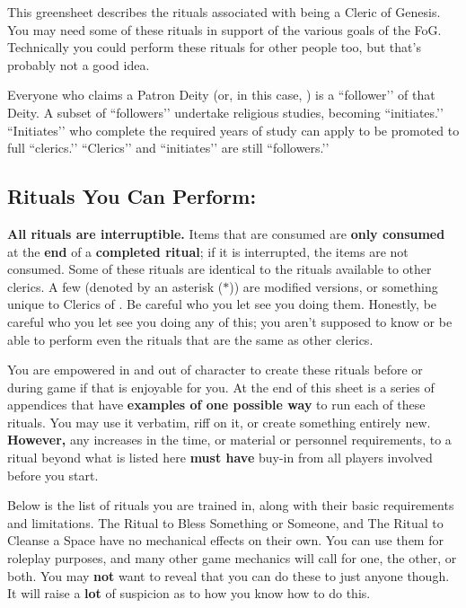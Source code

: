 \documentclass[green]{GL2020}
\begin{document}
\name{\gFoGCleric{}}

This greensheet describes the rituals associated with being a Cleric of Genesis. You may need some of these rituals in support of the various goals of the FoG. Technically you could perform these rituals for other people too, but that's probably not a good idea.

Everyone who claims a Patron Deity (or, in this case, \cGenesis{}) is a ``follower’’ of that Deity. A subset of ``followers’’ undertake religious studies, becoming ``initiates.’’ ``Initiates’’ who complete the required years of study can apply to be promoted to full ``clerics.’’ ``Clerics’’ and ``initiates’’ are still ``followers.’’

\subsection*{Rituals You Can Perform:}
\textbf{All rituals are interruptible.} Items that are consumed are \textbf{only consumed }at the \textbf{end} of a \textbf{completed ritual}; if it is interrupted, the items are not consumed. Some of these rituals are identical to the rituals available to other clerics. A few (denoted by an asterisk ($*$)) are modified versions, or something unique to Clerics of \cGenesis{}. Be careful who you let see you doing them. Honestly, be careful who you let see you doing any of this; you aren't supposed to know or be able to perform even the rituals that are the same as other clerics.

You are empowered in and out of character to create these rituals before or during game if that is enjoyable for you. At the end of this sheet is a series of appendices that have \textbf{examples of one possible way} to run each of these rituals. You may use it verbatim, riff on it, or create something entirely new. \textbf{However,} any increases in the time, or material or personnel requirements, to a ritual beyond what is listed here \textbf{must have} buy-in from all players involved before you start.

Below is the list of rituals you are trained in, along with their basic requirements and limitations. The Ritual to Bless Something or Someone, and The Ritual to Cleanse a Space have no mechanical effects on their own. You can use them for roleplay purposes, and many other game mechanics will call for one, the other, or both. You may \textbf{not} want to reveal that you can do these to just anyone though. It will raise a \textbf{lot} of suspicion as to how you know how to do this.
\end{document}
